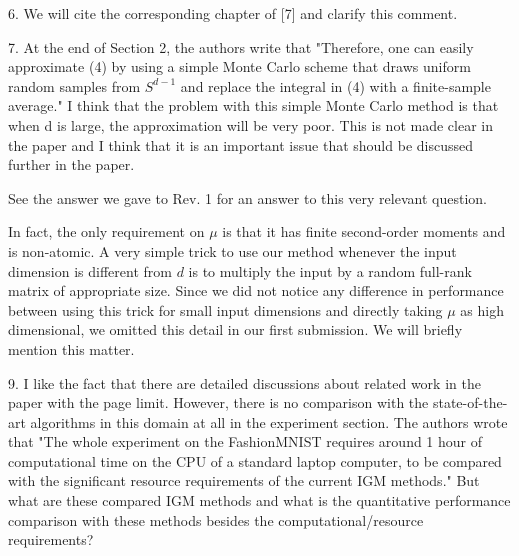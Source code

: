 \documentclass{article}
\newcommand{\rev}[1]{{\color{red} #1}}
\newcommand{\umut}[1]{{\color{blue} #1}}
\newcommand{\antoine}[1]{{\color{orange} #1}}
\begin{document}

6. We will cite the corresponding chapter of [7] and clarify this comment.


\rev{7. At the end of Section 2, the authors write that "Therefore, one can easily approximate (4) by using a simple Monte Carlo scheme that draws uniform random samples from $S^{d-1}$ and replace the integral in (4) with a finite-sample average." I think that the problem with this simple Monte Carlo method is that when d is large, the approximation will be very poor. This is not made clear in the paper and I think that it is an important issue that should be discussed further in the paper.}

\antoine{See the answer we gave to Rev. 1 for an answer to this very relevant question.}



In fact, the only requirement on $\mu$ is that it has finite second-order moments and is non-atomic. A very simple trick to use our method whenever the input dimension is different from $d$ is to multiply the input by a random full-rank matrix of appropriate size. Since we did not notice any difference in performance between using this trick for small input dimensions and directly taking $\mu$ as high dimensional, we omitted this detail in our first submission. We will briefly mention this matter.

\rev{9. I like the fact that there are detailed discussions about related work in the paper with the page limit. However, there is no comparison with the state-of-the-art algorithms in this domain at all in the experiment section. The authors wrote that "The whole experiment on the FashionMNIST requires around 1 hour of computational time on the CPU of a standard laptop computer, to be compared with the significant resource requirements of the current IGM methods." But what are these compared IGM methods and what is the quantitative performance comparison with these methods besides the computational/resource requirements?}
\end{document}
